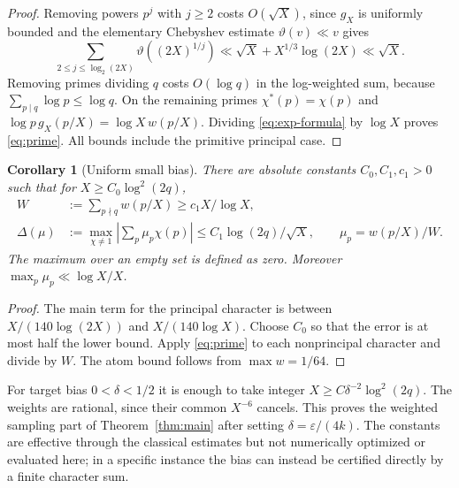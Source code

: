 \documentclass[11pt]{article}
\newtheorem{corollary}[theorem]{Corollary}
\theoremstyle{remark}\newtheorem{remark}[theorem]{Remark}
\begin{document}
\begin{proof}
Removing powers $p^j$ with $j\ge2$ costs $O(\sqrt X)$, since $g_X$ is uniformly bounded and the elementary Chebyshev estimate $\vartheta(v)\ll v$ gives
\[
 \sum_{2\le j\le\log_2(2X)}\vartheta((2X)^{1/j})
 \ll\sqrt X+X^{1/3}\log(2X)\ll\sqrt X.
\]
Removing primes dividing $q$ costs $O(\log q)$ in the log-weighted sum, because $\sum_{p\mid q}\log p\le\log q$. On the remaining primes $\chi^*(p)=\chi(p)$ and $\log p\,g_X(p/X)=\log X\,w(p/X)$. Dividing \eqref{eq:exp-formula} by $\log X$ proves \eqref{eq:prime}. All bounds include the primitive principal case.
\end{proof}

\begin{corollary}[Uniform small bias]\label{cor:bias}
There are absolute constants $C_0,C_1,c_1>0$ such that for $X\ge C_0\log^2(2q)$,
\begin{align*}
 W&:=\sum_{p\nmid q}w(p/X)\ge c_1 X/\log X,\\
 \Delta(\mu)&:=\max_{\chi\ne1}\left|\sum_p\mu_p\chi(p)\right|\le C_1\log(2q)/\sqrt X,
 \qquad \mu_p=w(p/X)/W.
\end{align*}
The maximum over an empty set is defined as zero. Moreover $\max_p\mu_p\ll\log X/X$.
\end{corollary}
\begin{proof}
The main term for the principal character is between $X/(140\log(2X))$ and $X/(140\log X)$. Choose $C_0$ so that the error is at most half the lower bound. Apply \eqref{eq:prime} to each nonprincipal character and divide by $W$. The atom bound follows from $\max w=1/64$.
\end{proof}
For target bias $0<\delta<1/2$ it is enough to take integer $X\ge C\delta^{-2}\log^2(2q)$. The weights are rational, since their common $X^{-6}$ cancels. This proves the weighted sampling part of Theorem~\ref{thm:main} after setting $\delta=\varepsilon/(4k)$. The constants are effective through the classical estimates but not numerically optimized or evaluated here; in a specific instance the bias can instead be certified directly by a finite character sum.
\end{document}
